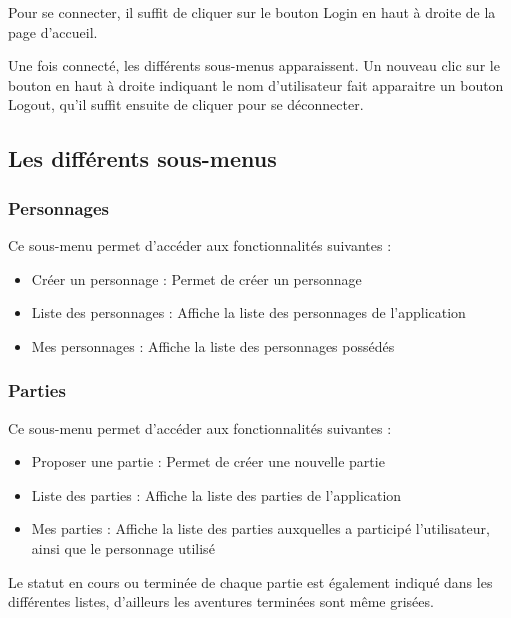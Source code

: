 \documentclass[a4paper, 11pt, titlepage]{article}
\begin{document}
Pour se connecter, il suffit de cliquer sur le bouton Login en haut à droite de la page d'accueil.

Une fois connecté, les différents sous-menus apparaissent. Un nouveau clic sur le bouton en haut à droite indiquant le nom d'utilisateur fait apparaitre un bouton Logout, qu'il suffit ensuite de cliquer pour se déconnecter.


\subsection {Les différents sous-menus}

\subsubsection {Personnages}

Ce sous-menu permet d'accéder aux fonctionnalités suivantes :

\begin{itemize}
\item
Créer un personnage : Permet de créer un personnage

\item
Liste des personnages : Affiche la liste des personnages de l'application

\item
Mes personnages : Affiche la liste des personnages possédés

\end{itemize}


\subsubsection {Parties}

Ce sous-menu permet d'accéder aux fonctionnalités suivantes :

\begin{itemize}
\item
Proposer une partie : Permet de créer une nouvelle partie

\item
Liste des parties : Affiche la liste des parties de l'application

\item
Mes parties : Affiche la liste des parties auxquelles a participé l'utilisateur, ainsi que le personnage utilisé

\end{itemize}

Le statut en cours ou terminée de chaque partie est également indiqué dans les différentes listes, d'ailleurs les aventures terminées sont même grisées.
\end{document}
